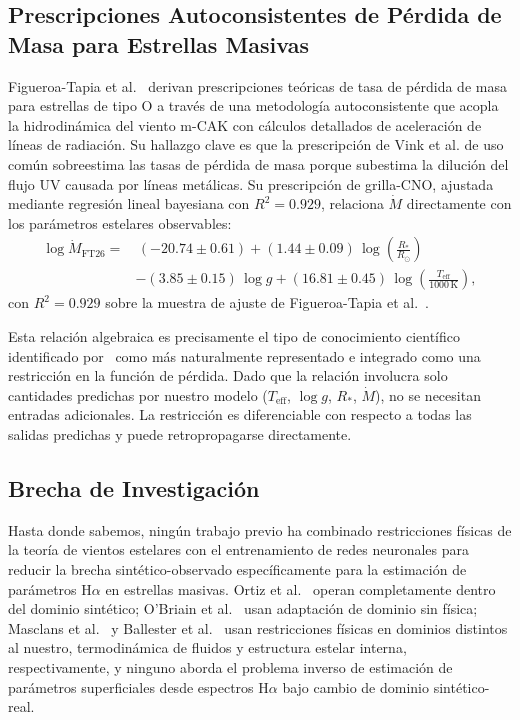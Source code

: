 \documentclass[sigconf,ACM]{acmart}
\begin{document}
\subsection{Prescripciones Autoconsistentes de Pérdida de Masa para Estrellas
Masivas}

Figueroa-Tapia et al.~\cite{FigueroaTapia2026} derivan prescripciones teóricas de tasa de pérdida de masa para estrellas de tipo O a través de una metodología autoconsistente que acopla la hidrodinámica del viento m-CAK con cálculos detallados de aceleración de líneas de radiación. Su hallazgo clave es que la prescripción de Vink et al. \cite{vink2000new} de uso común sobreestima las tasas de pérdida de masa porque subestima la dilución del flujo UV causada por líneas metálicas. Su prescripción de grilla-CNO, ajustada mediante regresión lineal bayesiana con $R^2 = 0.929$, relaciona $\dot{M}$ directamente con los parámetros estelares observables:
\begin{equation}
\begin{split}
  \log \dot{M}_\mathrm{FT26} = &\,(-20.74 \pm 0.61) + (1.44 \pm 0.09)\,\log\!\left(\frac{R_*}{R_\odot}\right) \\
  &- (3.85 \pm 0.15)\,\log g + (16.81 \pm 0.45)\,\log\!\left(\frac{T_\mathrm{eff}}{1000\,\mathrm{K}}\right),
\end{split}
\label{eq:cno_uncert}
\end{equation}
con $R^2 = 0.929$ sobre la muestra de ajuste de Figueroa-Tapia et al.~\cite{FigueroaTapia2026}.

Esta relación algebraica es precisamente el tipo de conocimiento científico identificado por~\cite{vonRueden2021} como más naturalmente representado e integrado como una restricción en la función de pérdida. Dado que la relación involucra solo cantidades predichas por nuestro modelo ($T_\mathrm{eff}$,
$\log g$, $R_*$, $\dot{M}$), no se necesitan entradas adicionales. La restricción es diferenciable con respecto a todas las salidas predichas y puede retropropagarse directamente.

\subsection{Brecha de Investigación}

Hasta donde sabemos, ningún trabajo previo ha combinado restricciones físicas de la teoría de vientos estelares con el entrenamiento de redes neuronales para reducir la brecha sintético-observado específicamente para la estimación de parámetros H$\alpha$ en estrellas masivas. Ortiz et al.~\cite{Ortiz2025} operan completamente dentro del dominio sintético; O'Briain et al.~\cite{OBriain2021} usan adaptación de dominio sin física; Masclans et al.~\cite{Masclans2023} y Ballester et al.~\cite{Ballester2026} usan restricciones físicas en dominios distintos al nuestro, termodinámica de fluidos y estructura estelar interna, respectivamente, y ninguno aborda el problema inverso de estimación de parámetros superficiales desde espectros H$\alpha$ bajo cambio de dominio sintético-real.
\end{document}
